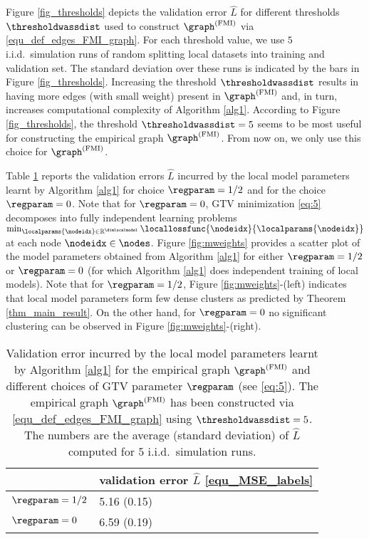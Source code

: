 \documentclass[lettersize,journal]{IEEEtran}
\newcommand{\testmse}{\widehat{L} }
\begin{document}
Figure \ref{fig_thresholds} depicts the validation error $\testmse$ for different thresholds $\thresholdwassdist$ 
used to construct $\graph^{(\rm FMI)}$ via \eqref{equ_def_edges_FMI_graph}. 
For each threshold value, we use $5$ i.i.d.\ simulation runs of random splitting local datasets into 
training and validation set. The standard deviation over these runs is indicated by the bars in Figure \ref{fig_thresholds}.
 Increasing the threshold $\thresholdwassdist$ results in having more edges (with small weight) 
 present in $\graph^{(\rm FMI)}$ and, in turn, increases computational complexity of Algorithm \ref{alg1}. 
According to Figure \ref{fig_thresholds}, the threshold $\thresholdwassdist=5$ seems to be most useful for 
constructing the empirical graph $\graph^{( \rm FMI)}$. From now on, we only use this choice for $\graph^{(\rm FMI)}$. 

Table \ref{tbl:FMI} reports the validation errors $\testmse$ incurred by the local model parameters 
learnt by Algorithm \ref{alg1} for choice $\regparam=1/2$ and for the choice $\regparam=0$. Note that 
for $\regparam=0$, GTV minimization \eqref{eq:5} decomposes into fully independent learning problems 
$\min_{\localparams{\nodeidx} \in \mathbb{R}^{\dimlocalmodel}} \locallossfunc{\nodeidx}{\localparams{\nodeidx}}$ at each node $\nodeidx \in \nodes$. 
Figure \ref{fig:mweights} provides a scatter plot of the model parameters obtained from Algorithm \ref{alg1} 
for either $\regparam=1/2$ or $\regparam =0$ (for which Algorithm \ref{alg1} does independent training of local models). 
Note that for $\regparam=1/2$, Figure \ref{fig:mweights}-(left) indicates that local model parameters 
form few dense clusters as predicted by Theorem \ref{thm_main_result}. On the other hand, for 
$\regparam=0$ no significant clustering can be observed in Figure \ref{fig:mweights}-(right).  

\begin{table}
\centering
    \begin{tabular}{ | p{1.8cm} | p{3.4cm} | }
     \hline
		         & validation error $\testmse$ \eqref{equ_MSE_labels}   \\ \hline
		$\regparam=1/2$ & 5.16 (0.15) \\ \hline
		$\regparam=0$  & 6.59 (0.19)  \\ \hline
    \end{tabular}
\vspace*{3mm}
    \caption{Validation error incurred by the local model parameters learnt by Algorithm \ref{alg1} 
    	for the empirical graph $\graph^{(\rm FMI)}$ and different choices of GTV parameter $\regparam$ (see \eqref{eq:5}). 
    The empirical graph $\graph^{(\rm FMI)}$ has been constructed via \eqref{equ_def_edges_FMI_graph} using $\thresholdwassdist=5$. 
The numbers are the average (standard deviation) of $\testmse$ computed for $5$ i.i.d.\ simulation runs.}
\label{tbl:FMI}
\end{table}
\end{document}
